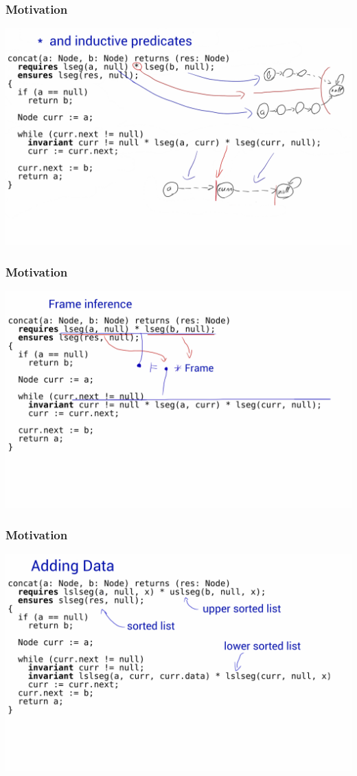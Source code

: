\documentclass{beamer}
\begin{document}
\begin{frame}
  \frametitle{Motivation}
  \includegraphics[scale=0.17]{resources/star.png}
\end{frame}

\begin{frame}
  \frametitle{Motivation}
  \includegraphics[scale=0.17]{resources/frame.png}
\end{frame}

\begin{frame}
  \frametitle{Motivation}
  \includegraphics[scale=0.17]{resources/sorted.png}
\end{frame}
\end{document}
